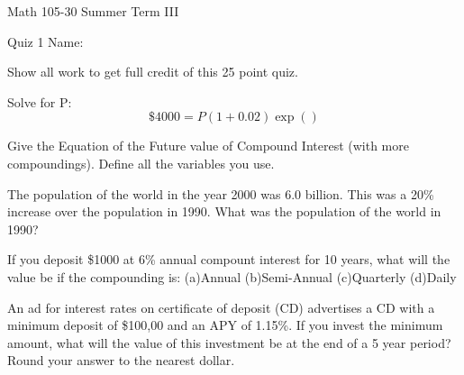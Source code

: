 \documentclass[11pt,epsfig]{article}
\begin{document}
Math 105-30 Summer Term III 

Quiz 1 \hspace{1.9in} {Name:} {\underline {\hspace{2.5in}}}
\vspace{2pc}

Show all work to get full credit of this 25 point quiz.
\vspace{2pc}

\begin{problem}{5}
Solve for P:
\begin{equation}
\$ 4000=P(1+0.02)\exp()
\end{equation}
\vfill
\end{problem}

\begin{problem}{4}
Give the Equation of the Future value of Compound Interest (with more compoundings). Define all the variables you use. 
\vfill
\end{problem}

\begin{problem}{5}
The population of the world in the year 2000 was 6.0 billion. This was a 20\%
increase over the population in 1990. What was the population of the world in 1990?
\vfill
\end{problem}

\newpage

\begin{problem}{6}
If you deposit \$1000 at 6\% annual compount interest for 10 years, what will the value be if the compounding is:
\newline(a)Annual
\newline(b)Semi-Annual
\newline(c)Quarterly
\newline(d)Daily
\vfill
\end{problem}

\begin{problem}{5}
An ad for interest rates on certificate of deposit (CD) advertises a CD with a minimum deposit of \$100,00 and an APY of 1.15\%. 
If you invest the minimum amount, what will the value of this investment be at the end of a 5 year period? Round your answer to the nearest dollar.
\vfill
\end{problem}

\showpoints
\end{document}
